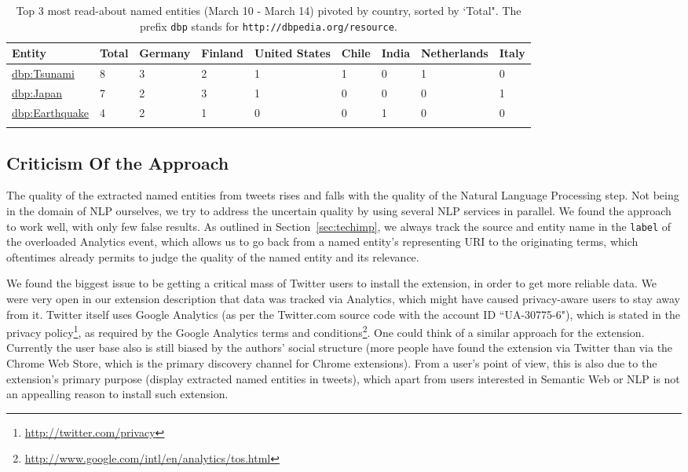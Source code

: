 \documentclass[runningheads,a4paper]{llncs}
\begin{document}
\begin{table}[htb!]
\begin{center}
\begin{tabular}{lllllllll}
\hline
Entity & Total & Germany & Finland & United States & Chile & India & Netherlands & Italy \\
\hline
\url{dbp:Tsunami} & 8 & 3 & 2 & 1 & 1 & 0 & 1 & 0 \\
\url{dbp:Japan} & 7 & 2 & 3 & 1 & 0 & 0 & 0 & 1 \\
\url{dbp:Earthquake} & 4 & 2 & 1 & 0 & 0 & 1 & 0 & 0 \\
\hline \\
\end{tabular}
\end{center}
\caption{Top 3 most read-about named entities (March 10 - March 14) pivoted by country, sorted by `Total". The prefix \texttt{dbp} stands for \texttt{http://dbpedia.org/resource}.}\label{table:pivotbycountry}
\end{table}

\subsection{Criticism Of the Approach}\label{sec:criticism}
The quality of the extracted named entities from tweets rises and falls with the quality of the Natural Language Processing step. Not being in the domain of NLP ourselves, we try to address the uncertain quality by using several NLP services in parallel. We found the approach to work well, with only few false results. As outlined in Section~\ref{sec:techimp}, we always track the source and entity name in the \texttt{label} of the overloaded Analytics event, which allows us to go back from a named entity's representing URI to the originating terms, which oftentimes already permits to judge the quality of the named entity and its relevance.

We found the biggest issue to be getting a critical mass of Twitter users to install the extension, in order to get more reliable data. We were very open in our extension description that data was tracked via Analytics, which might have caused privacy-aware users to stay away from it. Twitter itself uses Google Analytics (as per the Twitter.com source code with the account ID ``UA-30775-6"), which is stated in the privacy policy\footnote{\url{http://twitter.com/privacy}}, as required by the Google Analytics terms and conditions\footnote{\url{http://www.google.com/intl/en/analytics/tos.html}}. One could think of a similar approach for the extension. Currently the user base also is still biased by the authors' social structure (more people have found the extension via Twitter than via the Chrome Web Store, which is the primary discovery channel for Chrome extensions). From a user's point of view, this is also due to the extension's primary purpose (display extracted named entities in tweets), which apart from users interested in Semantic Web or NLP is not an appealling reason to install such extension. 
\end{document}
